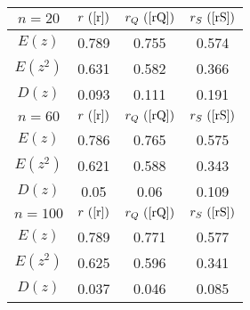\begin{tabular}{|c|c|c|c|}
\hline
$n = 20$ & $r ~(\ref{r})$ & $r_Q ~(\ref{rQ})$ & $r_S ~(\ref{rS})$\\
\hline
$E(z)$ & 0.789 & 0.755 & 0.574\\
\hline
$E(z^2)$ & 0.631 & 0.582 & 0.366\\
\hline
$D(z)$ & 0.093 & 0.111 & 0.191\\
\hline
$n = 60$ & $r ~(\ref{r})$ & $r_Q ~(\ref{rQ})$ & $r_S ~(\ref{rS})$\\
\hline
$E(z)$ & 0.786 & 0.765 & 0.575\\
\hline
$E(z^2)$ & 0.621 & 0.588 & 0.343\\
\hline
$D(z)$ & 0.05 & 0.06 & 0.109\\
\hline
$n = 100$ & $r ~(\ref{r})$ & $r_Q ~(\ref{rQ})$ & $r_S ~(\ref{rS})$\\
\hline
$E(z)$ & 0.789 & 0.771 & 0.577\\
\hline
$E(z^2)$ & 0.625 & 0.596 & 0.341\\
\hline
$D(z)$ & 0.037 & 0.046 & 0.085\\
\hline
\end{tabular}